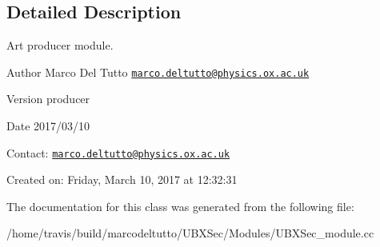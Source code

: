 \subsection{Detailed Description}
Art producer module. 

\begin{DoxyAuthor}{Author}
Marco Del Tutto \href{mailto:marco.deltutto@physics.ox.ac.uk}{\tt marco.\-deltutto@physics.\-ox.\-ac.\-uk}
\end{DoxyAuthor}
\begin{DoxyVersion}{Version}
producer
\end{DoxyVersion}
\begin{DoxyDate}{Date}
2017/03/10
\end{DoxyDate}
Contact\-: \href{mailto:marco.deltutto@physics.ox.ac.uk}{\tt marco.\-deltutto@physics.\-ox.\-ac.\-uk}

Created on\-: Friday, March 10, 2017 at 12\-:32\-:31 

The documentation for this class was generated from the following file\-:\begin{DoxyCompactItemize}
\item 
/home/travis/build/marcodeltutto/\-U\-B\-X\-Sec/\-Modules/U\-B\-X\-Sec\-\_\-module.\-cc\end{DoxyCompactItemize}
